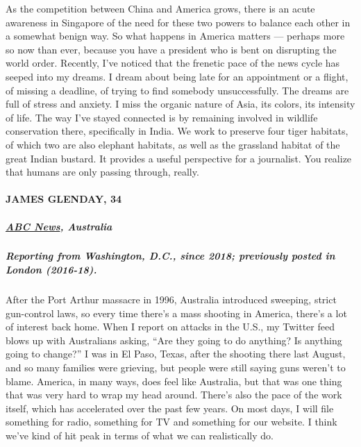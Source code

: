 As the competition between China and America grows, there is an acute
awareness in Singapore of the need for these two powers to balance each
other in a somewhat benign way. So what happens in America matters ---
perhaps more so now than ever, because you have a president who is bent
on disrupting the world order. Recently, I've noticed that the frenetic
pace of the news cycle has seeped into my dreams. I dream about being
late for an appointment or a flight, of missing a deadline, of trying to
find somebody unsuccessfully. The dreams are full of stress and anxiety.
I miss the organic nature of Asia, its colors, its intensity of life.
The way I've stayed connected is by remaining involved in wildlife
conservation there, specifically in India. We work to preserve four
tiger habitats, of which two are also elephant habitats, as well as the
grassland habitat of the great Indian bustard. It provides a useful
perspective for a journalist. You realize that humans are only passing
through, really.

\hypertarget{james-glenday-34}{%
\paragraph{JAMES GLENDAY, 34}\label{james-glenday-34}}

\hypertarget{abc-news-australia}{%
\subparagraph{\texorpdfstring{\textbf{\href{https://www.abc.net.au/news/}{ABC
News}, Australia}}{ABC News, Australia}}\label{abc-news-australia}}

\hypertarget{reporting-from-washington-dc-since-2018-previously-posted-in-london-2016-18}{%
\subparagraph{\texorpdfstring{\textbf{Reporting from Washington, D.C.,
since 2018; previously posted in London
(2016-18).}}{Reporting from Washington, D.C., since 2018; previously posted in London (2016-18).}}\label{reporting-from-washington-dc-since-2018-previously-posted-in-london-2016-18}}

After the Port Arthur massacre in 1996, Australia introduced sweeping,
strict gun-control laws, so every time there's a mass shooting in
America, there's a lot of interest back home. When I report on attacks
in the U.S., my Twitter feed blows up with Australians asking, ``Are
they going to do anything? Is anything going to change?'' I was in El
Paso, Texas, after the shooting there last August, and so many families
were grieving, but people were still saying guns weren't to blame.
America, in many ways, does feel like Australia, but that was one thing
that was very hard to wrap my head around. There's also the pace of the
work itself, which has accelerated over the past few years. On most
days, I will file something for radio, something for TV and something
for our website. I think we've kind of hit peak in terms of what we can
realistically do.

